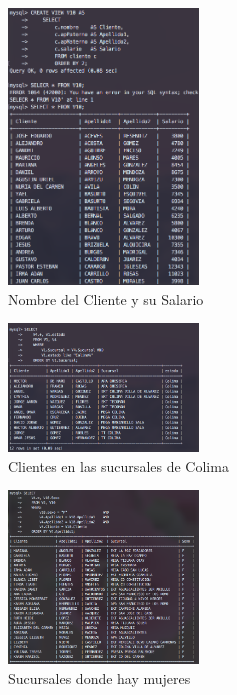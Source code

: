 \documentclass[12pt, fleqn]{article}                             %
\begin{document}
        \begin{figure}[ht!]
            \centering
            \includegraphics[width=0.45\textwidth]{BD5Reporte11}
            \caption{Nombre del Cliente y su Salario}
        \end{figure}

        \clearpage

        \begin{figure}[ht!]
            \centering
            \includegraphics[width=0.45\textwidth]{BD5Reporte2Parte1}
            \caption{Clientes en las sucursales de Colima}
        \end{figure}

        \begin{figure}[ht!]
            \centering
            \includegraphics[width=0.45\textwidth]{BD5Reporte2Parte2}
            \caption{Sucursales donde hay mujeres}
        \end{figure}
\end{document}

